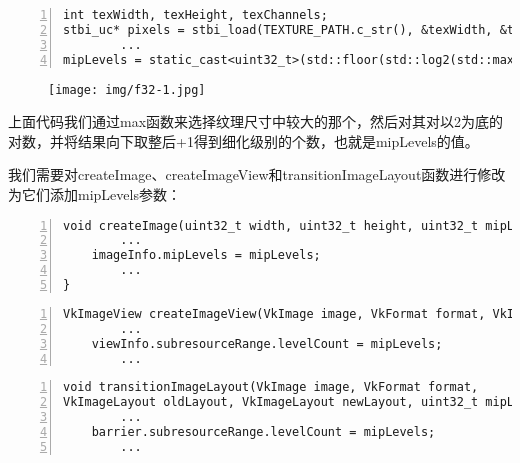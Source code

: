 \documentclass{ctexart}
\begin{document}
\begin{lstlisting}[language={[ANSI]C},keywordstyle=\color{blue!70},commentstyle=\color{red!50!green!50!blue!50},frame=shadowbox, rulesepcolor=\color{red!20!green!20!blue!20},basicstyle=\small,numbers=left, numberstyle=\tiny,breaklines=true]
int texWidth, texHeight, texChannels;
stbi_uc* pixels = stbi_load(TEXTURE_PATH.c_str(), &texWidth, &texHeight, &texChannels, STBI_rgb_alpha);
		...
mipLevels = static_cast<uint32_t>(std::floor(std::log2(std::max(texWidth, texHeight)))) + 1;
\end{lstlisting}

\begin{figure}[H]
	\centering
	\texttt{[image: img/f32-1.jpg]}
\end{figure}

上面代码我们通过max函数来选择纹理尺寸中较大的那个，然后对其对以2为底的对数，并将结果向下取整后+1得到细化级别的个数，也就是mipLevels的值。

我们需要对createImage、createImageView和transitionImageLayout函数进行修改为它们添加mipLevels参数：

\begin{lstlisting}[language={[ANSI]C},keywordstyle=\color{blue!70},commentstyle=\color{red!50!green!50!blue!50},frame=shadowbox, rulesepcolor=\color{red!20!green!20!blue!20},basicstyle=\small,numbers=left, numberstyle=\tiny,breaklines=true]
void createImage(uint32_t width, uint32_t height, uint32_t mipLevels, VkFormat format, VkImageTiling tiling, VkImageUsageFlags usage, VkMemoryPropertyFlags properties, VkImage& image, VkDeviceMemory& imageMemory) {
		...
	imageInfo.mipLevels = mipLevels;
		...
}
\end{lstlisting}

\begin{lstlisting}[language={[ANSI]C},keywordstyle=\color{blue!70},commentstyle=\color{red!50!green!50!blue!50},frame=shadowbox, rulesepcolor=\color{red!20!green!20!blue!20},basicstyle=\small,numbers=left, numberstyle=\tiny,breaklines=true]
VkImageView createImageView(VkImage image, VkFormat format, VkImageAspectFlags aspectFlags, uint32_t mipLevels) {
		...
	viewInfo.subresourceRange.levelCount = mipLevels;
		...
\end{lstlisting}

\begin{lstlisting}[language={[ANSI]C},keywordstyle=\color{blue!70},commentstyle=\color{red!50!green!50!blue!50},frame=shadowbox, rulesepcolor=\color{red!20!green!20!blue!20},basicstyle=\small,numbers=left, numberstyle=\tiny,breaklines=true]
void transitionImageLayout(VkImage image, VkFormat format,
VkImageLayout oldLayout, VkImageLayout newLayout, uint32_t mipLevels) {
		...
	barrier.subresourceRange.levelCount = mipLevels;
		...
\end{lstlisting}
\end{document}

